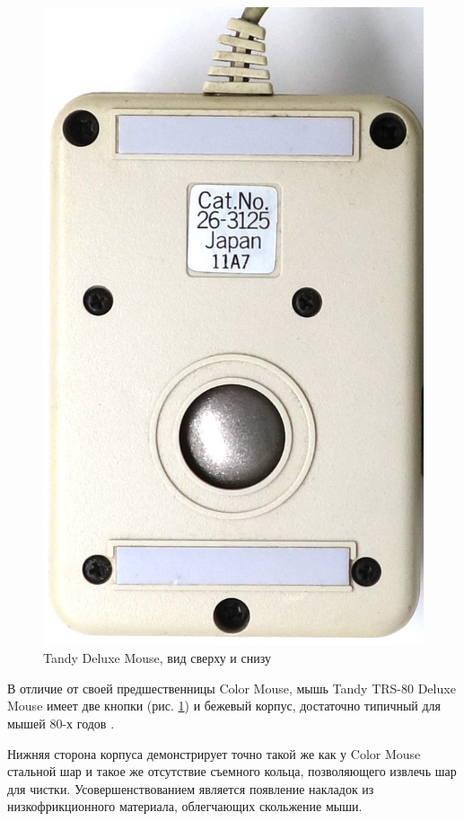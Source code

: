 \documentclass[11pt, a4paper]{article}
\begin{document}
\begin{figure}[h]
    \includegraphics[scale=0.65]{1988_tandy_trs80_deluxe_mouse/bottom_30.jpg}
    \caption{Tandy Deluxe Mouse, вид сверху и снизу}
    \label{fig:TandyDeluxeMouseTopAndBottom}
\end{figure}

В отличие от своей предшественницы Color Mouse, мышь Tandy TRS-80 Deluxe Mouse имеет две кнопки (рис. \ref{fig:TandyDeluxeMouseTopAndBottom}) и бежевый корпус, достаточно типичный для мышей 80-х годов \cite{hierophant}.

Нижняя сторона корпуса демонстрирует точно такой же как у Color Mouse стальной шар и такое же отсутствие съемного кольца, позволяющего извлечь шар для чистки. Усовершенствованием является появление накладок из низкофрикционного материала, облегчающих скольжение мыши.
\end{document}
